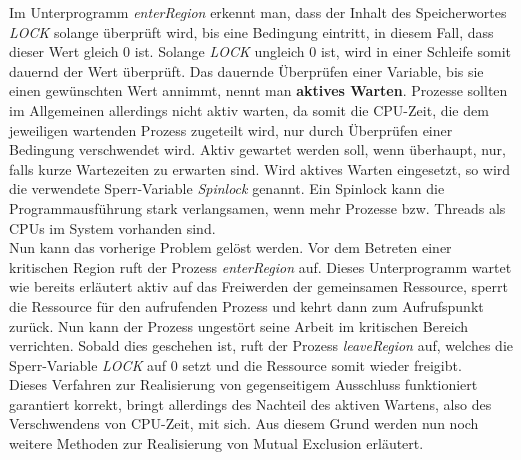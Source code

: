 \begin{description}
\begin{description}
								Im Unterprogramm \textit{enterRegion} erkennt man, dass der Inhalt des Speicherwortes \textit{LOCK} solange überprüft wird, bis eine Bedingung eintritt, in diesem Fall, dass dieser Wert gleich 0 ist. Solange \textit{LOCK} ungleich 0 ist, wird in einer Schleife somit dauernd der Wert überprüft. Das dauernde Überprüfen einer Variable, bis sie einen gewünschten Wert annimmt, nennt man \textbf{aktives Warten}. Prozesse sollten im Allgemeinen allerdings nicht aktiv warten, da somit die CPU-Zeit, die dem jeweiligen wartenden Prozess zugeteilt wird, nur durch Überprüfen einer Bedingung verschwendet wird. Aktiv gewartet werden soll, wenn überhaupt, nur, falls kurze Wartezeiten zu erwarten sind. Wird aktives Warten eingesetzt, so wird die verwendete Sperr-Variable \textit{Spinlock} genannt. Ein Spinlock kann die Programmausführung stark verlangsamen, wenn mehr Prozesse bzw. Threads als CPUs im System vorhanden sind. \cite{ModerneBetriebssysteme} \cite{SpinlockWikipedia}\\
								Nun kann das vorherige Problem gelöst werden. Vor dem Betreten einer kritischen Region ruft der Prozess \textit{enterRegion} auf. Dieses Unterprogramm wartet wie bereits erläutert aktiv auf das Freiwerden der gemeinsamen Ressource, sperrt die Ressource für den aufrufenden Prozess und kehrt dann zum Aufrufspunkt zurück. Nun kann der Prozess ungestört seine Arbeit im kritischen Bereich verrichten. Sobald dies geschehen ist, ruft der Prozess \textit{leaveRegion} auf, welches die Sperr-Variable \textit{LOCK} auf 0 setzt und die Ressource somit wieder freigibt.\\
								Dieses Verfahren zur Realisierung von gegenseitigem Ausschluss funktioniert garantiert korrekt, bringt allerdings des Nachteil des aktiven Wartens, also des Verschwendens von CPU-Zeit, mit sich. Aus diesem Grund werden nun noch weitere Methoden zur Realisierung von Mutual Exclusion erläutert. \cite{ModerneBetriebssysteme}
						\end{description}

					\item[{\parbox[t]{1.2\linewidth}{Wechselseitiger Ausschluss unter Verwendung von Semapho-\\ren}}] %
					

\end{description}

